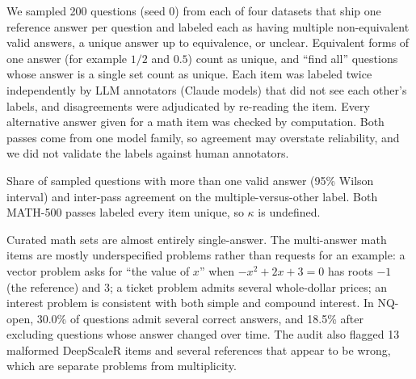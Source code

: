 We sampled 200 questions (seed 0) from each of four datasets that ship one reference answer per question and labeled each as having multiple non-equivalent valid answers, a unique answer up to equivalence, or unclear. Equivalent forms of one answer (for example $1/2$ and $0.5$) count as unique, and ``find all'' questions whose answer is a single set count as unique. Each item was labeled twice independently by LLM annotators (Claude models) that did not see each other's labels, and disagreements were adjudicated by re-reading the item. Every alternative answer given for a math item was checked by computation. Both passes come from one model family, so agreement may overstate reliability, and we did not validate the labels against human annotators.

\begin{table}[htbp]
\centering
\caption{Share of sampled questions with more than one valid answer (95\% Wilson interval) and inter-pass agreement on the multiple-versus-other label. Both MATH-500 passes labeled every item unique, so $\kappa$ is undefined.\ph}
\label{tab:prevalence}
\footnotesize
\begin{adjustbox}{max width=\linewidth}\end{adjustbox}

\end{table}

Curated math sets are almost entirely single-answer. The multi-answer math items are mostly underspecified problems rather than requests for an example: a vector problem asks for ``the value of $x$'' when $-x^2+2x+3=0$ has roots $-1$ (the reference) and $3$; a ticket problem admits several whole-dollar prices; an interest problem is consistent with both simple and compound interest. In NQ-open, 30.0\% of questions admit several correct answers, and 18.5\% after excluding questions whose answer changed over time. The audit also flagged 13 malformed DeepScaleR items and several references that appear to be wrong, which are separate problems from multiplicity.

